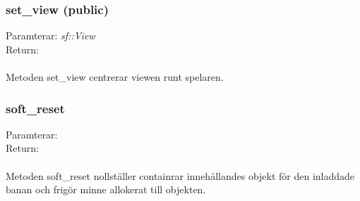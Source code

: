 \documentclass{TDP003mall}
\begin{document}
\subsubsection{set\_view (public)}
Paramterar: \textit{sf::View}
\\Return: \textit{}
\\\\
Metoden set\_view centrerar viewen runt spelaren.

\subsubsection{soft\_reset}
Paramterar: \textit{}
\\Return: \textit{}
\\\\
Metoden soft\_reset nollställer containrar innehållandes objekt för den inladdade banan och frigör minne allokerat till objekten.
\end{document}

